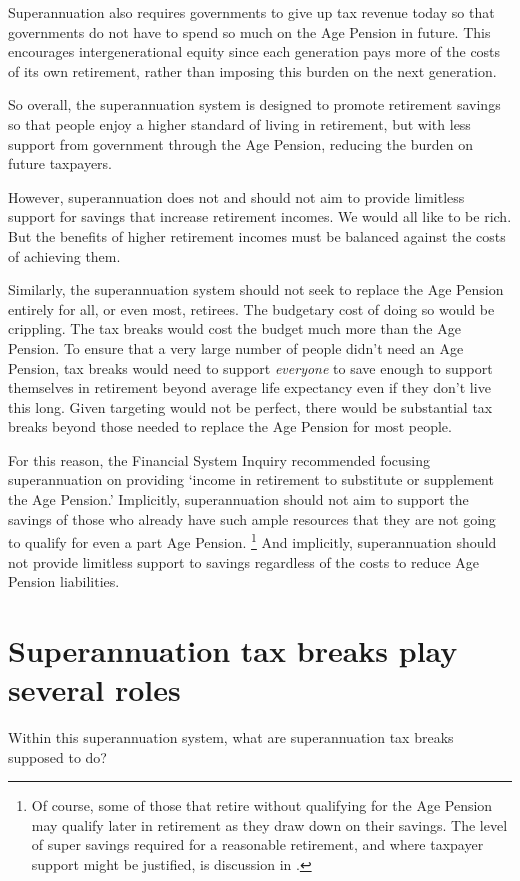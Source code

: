  Superannuation also requires governments to give up tax revenue today so that governments do not have to spend so much on the Age Pension in future. This encourages intergenerational equity since each generation pays more of the costs of its own retirement, rather than imposing this burden on the next generation. 

 So overall, the superannuation system is designed to promote retirement savings so that people enjoy a higher standard of living in retirement, but with less support from government through the Age Pension, reducing the burden on future taxpayers. 

 However, superannuation does not and should not aim to provide limitless support for savings that increase retirement incomes. We would all like to be rich. But the benefits of higher retirement incomes must be balanced against the costs of achieving them. 

 Similarly, the superannuation system should not seek to replace the Age Pension entirely for all, or even most, retirees. The budgetary cost of doing so would be crippling. The tax breaks would cost the budget much more than the Age Pension. To ensure that a very large number of people didn’t need an Age Pension, tax breaks would need to support \emph{everyone} to save enough to support themselves in retirement beyond average life expectancy even if they don’t live this long. Given targeting would not be perfect, there would be substantial tax breaks beyond those needed to replace the Age Pension for most people. 

 For this reason, the Financial System Inquiry recommended focusing superannuation on providing ‘income in retirement to substitute or supplement the Age Pension.’ Implicitly, superannuation should not aim to support the savings of those who already have such ample resources that they are not going to qualify for even a part Age Pension.%
\footnote{%
Of course, some of those that retire without qualifying for the Age Pension may qualify later in retirement as they draw down on their savings. The level of super savings required for a reasonable retirement, and where taxpayer support might be justified, is discussion in .
}
  And implicitly, superannuation should not provide limitless support to savings regardless of the costs to reduce Age Pension liabilities.

\section{Superannuation tax breaks play several roles}\label{sec:SUPER-2-4}
Within this superannuation system, what are superannuation tax breaks supposed to do?

